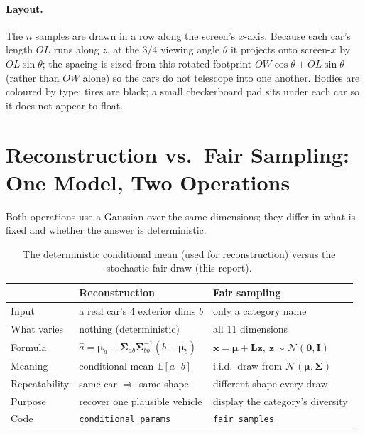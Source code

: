 \documentclass[11pt]{article}
\newcommand{\OL}{\mathit{OL}}
\newcommand{\OW}{\mathit{OW}}
\newcommand{\given}{\,\vert\,}
\newcommand{\Norm}{\mathcal{N}}
\newcommand{\bmu}{\boldsymbol{\mu}}
\newcommand{\bSigma}{\boldsymbol{\Sigma}}
\newcommand{\bx}{\mathbf{x}}
\newcommand{\bz}{\mathbf{z}}
\newcommand{\Lmat}{\mathbf{L}}
\newcommand{\Imat}{\mathbf{I}}
\theoremstyle{definition}
\begin{document}
\paragraph{Layout.} The $n$ samples are drawn in a row along the screen's $x$-axis. Because each car's length $\OL$ runs along $z$, at the $3/4$ viewing angle $\theta$ it projects onto screen-$x$ by $\OL\sin\theta$; the spacing is sized from this rotated footprint $\OW\cos\theta+\OL\sin\theta$ (rather than $\OW$ alone) so the cars do not telescope into one another. Bodies are coloured by type; tires are black; a small checkerboard pad sits under each car so it does not appear to float.

\section{Reconstruction vs.\ Fair Sampling: One Model, Two Operations}

Both operations use a Gaussian over the same dimensions; they differ in what is fixed and whether the answer is deterministic.

\begin{table}[H]
\centering
\renewcommand{\arraystretch}{1.3}
\begin{tabular}{p{3.2cm} p{5.4cm} p{5.4cm}}
\toprule
 & \textbf{Reconstruction} & \textbf{Fair sampling} \\
\midrule
Input            & a real car's 4 exterior dims $b$ & only a category name \\
What varies      & nothing (deterministic) & all 11 dimensions \\
Formula          & $\hat a=\bmu_a+\bSigma_{ab}\bSigma_{bb}^{-1}(b-\bmu_b)$ & $\bx=\bmu+\Lmat\bz,\ \bz\sim\Norm(\mathbf0,\Imat)$ \\
Meaning          & conditional mean $\mathbb{E}[a\given b]$ & i.i.d.\ draw from $\Norm(\bmu,\bSigma)$ \\
Repeatability    & same car $\Rightarrow$ same shape & different shape every draw \\
Purpose          & recover one plausible vehicle & display the category's diversity \\
Code             & \texttt{conditional\_params} & \texttt{fair\_samples} \\
\bottomrule
\end{tabular}
\caption{The deterministic conditional mean (used for reconstruction) versus the stochastic fair draw (this report).}
\end{table}
\end{document}
